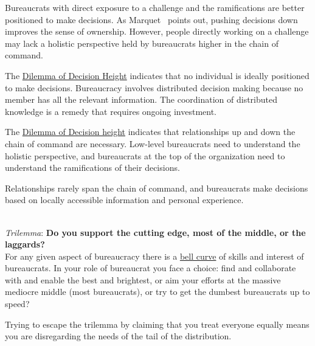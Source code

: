Bureaucrats with direct exposure to a challenge and the ramifications are better positioned to make decisions. As Marquet~\cite{2013_Marquet} points out, pushing decisions down improves the sense of ownership. However, people directly working on a challenge may lack a holistic perspective held by bureaucrats higher in the chain of command. 

The \hyperref[table:dilemma-org-decisions-low-vs-high]{Dilemma of Decision Height} indicates that no individual is ideally positioned to make decisions. Bureaucracy involves distributed decision making because no member has all the relevant information. The coordination of distributed knowledge is a remedy that requires ongoing investment.

The \hyperref[table:dilemma-org-decisions-low-vs-high]{Dilemma of Decision height} indicates that relationships up and down the chain of command are necessary. Low-level bureaucrats need to understand the holistic perspective, and bureaucrats at the top of the organization need to understand the ramifications of their decisions.

Relationships rarely span the chain of command, and bureaucrats make decisions based on locally accessible information and personal experience. 



\ \\

\textit{Trilemma}: \textbf{Do you support the cutting edge, most of the middle, or the laggards?}\\
For any given aspect of bureaucracy there is a \href{https://en.wikipedia.org/wiki/Normal_distribution}{bell curve} 
of skills and interest of bureaucrats. In your role of bureaucrat you face a choice: find and collaborate with and enable the best and brightest, or aim your efforts at the massive mediocre middle (most bureaucrats), or try to get the dumbest bureaucrats up to speed? 

Trying to escape the trilemma by claiming that you treat everyone equally means you are disregarding the needs of the tail of the distribution. 

